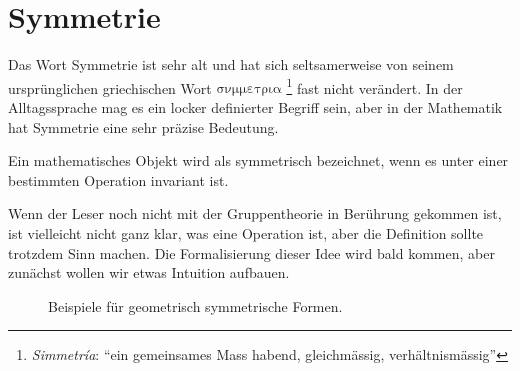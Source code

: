\section{Symmetrie}
Das Wort Symmetrie ist sehr alt und hat sich seltsamerweise von seinem
ursprünglichen griechischen Wort
\(\mathrm{\sigma\nu\mu\mu\varepsilon\tau\rho\iota\alpha}\)
\footnote{\emph{Simmetr\'ia}: ``ein gemeinsames Mass habend, gleichmässig,
verhältnismässig''} fast nicht verändert. In der Alltagssprache mag es ein
locker definierter Begriff sein, aber in der Mathematik hat Symmetrie eine sehr
präzise Bedeutung.
\begin{definition}[Symmetrie]
	Ein mathematisches Objekt wird als symmetrisch bezeichnet, wenn es unter einer
	bestimmten Operation invariant ist.
\end{definition}

Wenn der Leser noch nicht mit der Gruppentheorie in Berührung gekommen ist, ist
vielleicht nicht ganz klar, was eine Operation ist, aber die Definition sollte
trotzdem Sinn machen. Die Formalisierung dieser Idee wird bald kommen, aber
zunächst wollen wir etwas Intuition aufbauen.

\begin{figure}[h]
	\centering
	\caption{
		Beispiele für geometrisch symmetrische Formen.
		\label{fig:punktgruppen:geometry-example}
	}
\end{figure}

